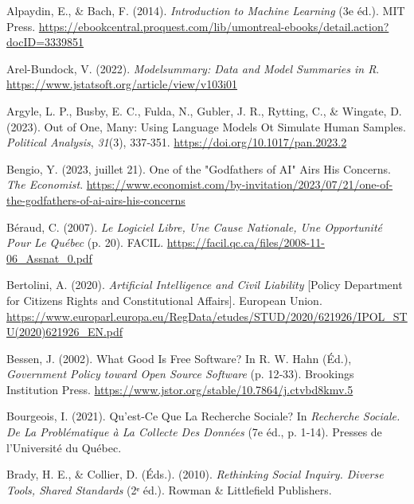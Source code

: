 \documentclass[
  letterpaper,
  DIV=11,
  numbers=noendperiod]{scrreprt}
\newlength{\cslhangindent}
\newenvironment{CSLReferences}[2] %
 {\begin{list}{}{%
  \setlength{\itemindent}{0pt}
  \setlength{\leftmargin}{0pt}
  \setlength{\parsep}{0pt}
  \ifodd #1
   \setlength{\leftmargin}{\cslhangindent}
   \setlength{\itemindent}{-1\cslhangindent}
  \fi
  \setlength{\itemsep}{#2\baselineskip}}}
 {\end{list}}
\begin{document}
\label{refs}
\begin{CSLReferences}{1}{0}
Alpaydin, E., \& Bach, F. (2014). \emph{Introduction to {Machine
Learning}} (3e éd.). MIT Press.
\url{https://ebookcentral.proquest.com/lib/umontreal-ebooks/detail.action?docID=3339851}

Arel-Bundock, V. (2022). \emph{Modelsummary: {Data} and {Model
Summaries} in {R}}. \url{https://www.jstatsoft.org/article/view/v103i01}

Argyle, L. P., Busby, E. C., Fulda, N., Gubler, J. R., Rytting, C., \&
Wingate, D. (2023). Out of {One}, {Many}: {Using Language Models} Ot
{Simulate Human Samples}. \emph{Political Analysis}, \emph{31}(3),
337‑351. \url{https://doi.org/10.1017/pan.2023.2}

Bengio, Y. (2023, juillet 21). One of the "Godfathers of {AI}" Airs His
Concerns. \emph{The Economist}.
\url{https://www.economist.com/by-invitation/2023/07/21/one-of-the-godfathers-of-ai-airs-his-concerns}

Béraud, C. (2007). \emph{Le Logiciel Libre, Une Cause Nationale, Une
Opportunité Pour Le {Québec}} (p. 20). FACIL.
\url{https://facil.qc.ca/files/2008-11-06_Assnat_0.pdf}

Bertolini, A. (2020). \emph{Artificial {Intelligence} and {Civil
Liability}} {[}Policy Department for Citizen\textquotesingle s Rights
and Constitutional Affairs{]}. European Union.
\url{https://www.europarl.europa.eu/RegData/etudes/STUD/2020/621926/IPOL_STU(2020)621926_EN.pdf}

Bessen, J. (2002). What {Good Is Free Software}? In R. W. Hahn (Éd.),
\emph{Government {Policy} toward {Open Source Software}} (p. 12‑33).
Brookings Institution Press.
\url{https://www.jstor.org/stable/10.7864/j.ctvbd8kmv.5}

Bourgeois, I. (2021). Qu'est-Ce Que La Recherche Sociale? In
\emph{Recherche Sociale. {De} La Problématique à La Collecte Des
Données} (7e éd., p. 1‑14). Presses de l'Université du Québec.

Brady, H. E., \& Collier, D. (Éds.). (2010). \emph{Rethinking {Social
Inquiry}. {Diverse Tools}, {Shared Standards}} (2ᵉ éd.). Rowman \&
Littlefield Publishers.


\end{CSLReferences}
\end{document}

